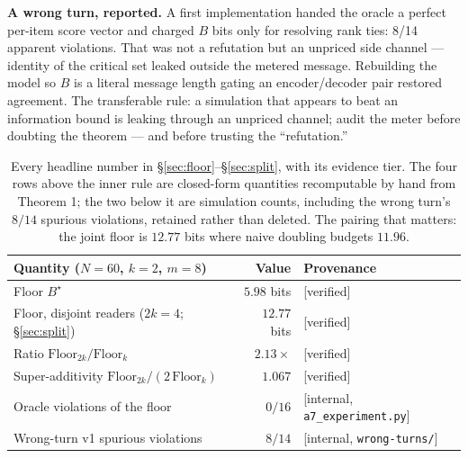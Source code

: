 \documentclass[11pt,a4paper]{article}
\begin{document}
\textbf{A wrong turn, reported.} A first implementation handed the oracle a perfect per-item score vector and charged $B$ bits only for resolving rank ties: 8/14 apparent violations. That was not a refutation but an unpriced side channel --- identity of the critical set leaked outside the metered message. Rebuilding the model so $B$ is a literal message length gating an encoder/decoder pair restored agreement. The transferable rule: a simulation that appears to beat an information bound is leaking through an unpriced channel; audit the meter before doubting the theorem --- and before trusting the ``refutation.''

\begin{table}[t]
\centering
\begin{tabular}{@{}lrl@{}}
\toprule
Quantity ($N{=}60$, $k{=}2$, $m{=}8$) & Value & Provenance \\
\midrule
Floor $B^\star$ & $5.98$ bits & [verified] \\
Floor, disjoint readers ($2k{=}4$; \S\ref{sec:split}) & $12.77$ bits & [verified] \\
Ratio $\mathrm{Floor}_{2k}/\mathrm{Floor}_{k}$ & $2.13\times$ & [verified] \\
Super-additivity $\mathrm{Floor}_{2k}/(2\,\mathrm{Floor}_{k})$ & $1.067$ & [verified] \\
\midrule
Oracle violations of the floor & $0/16$ & [internal, \texttt{a7\_experiment.py}] \\
Wrong-turn v1 spurious violations & $8/14$ & [internal, \texttt{wrong-turns/}] \\
\bottomrule
\end{tabular}
\caption{Every headline number in \S\ref{sec:floor}--\S\ref{sec:split}, with its evidence tier. The four rows above the inner rule are closed-form quantities recomputable by hand from Theorem 1; the two below it are simulation counts, including the wrong turn's $8/14$ spurious violations, retained rather than deleted. The pairing that matters: the joint floor is $12.77$ bits where naive doubling budgets $11.96$.}
\label{tab:numbers}
\end{table}




\end{document}
